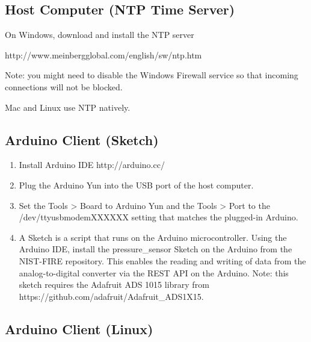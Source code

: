 \documentclass[11pt,oneside]{book}
\begin{document}
\subsection{Host Computer (NTP Time Server)}

On Windows, download and install the NTP server

http://www.meinbergglobal.com/english/sw/ntp.htm

Note: you might need to disable the Windows Firewall service so that incoming connections will not be blocked.

Mac and Linux use NTP natively.

\subsection{Arduino Client (Sketch)}

\begin{enumerate}
\item Install Arduino IDE
http://arduino.cc/
\item Plug the Arduino Yun into the USB port of the host computer.
\item Set the Tools > Board to Arduino Yun and the Tools > Port to the /dev/ttyusbmodemXXXXXX setting that matches the plugged-in Arduino.
\item A Sketch is a script that runs on the Arduino microcontroller. Using the Arduino IDE, install the pressure\_sensor Sketch on the Arduino from the NIST-FIRE repository. This enables the reading and writing of data from the analog-to-digital converter via the REST API on the Arduino. Note: this sketch requires the Adafruit ADS 1015 library from https://github.com/adafruit/Adafruit\_ADS1X15.
\end{enumerate}

\subsection{Arduino Client (Linux)}
\end{document}
